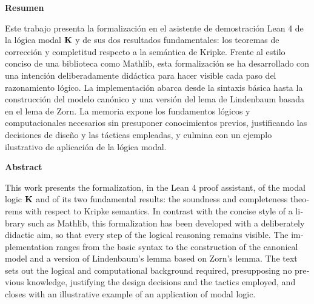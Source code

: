 
\newcommand{\rotuloresumen}[1]{%
  \begin{center}
    {\LARGE\bfseries #1\par}
  \end{center}
  \vspace{0.8\baselineskip}%
}

\thispagestyle{plain}
\markboth{}{}
\vspace*{2\baselineskip}

\rotuloresumen{Resumen}

\noindent Este trabajo presenta la formalización en el asistente de demostración Lean 4 de la lógica modal $\mathbf{K}$ y de sus dos resultados fundamentales: los teoremas de corrección y completitud respecto a la semántica de Kripke. Frente al estilo conciso de una biblioteca como Mathlib, esta formalización se ha desarrollado con una intención deliberadamente didáctica para hacer visible cada paso del razonamiento lógico. La implementación abarca desde la sintaxis básica hasta la construcción del modelo canónico y una versión del lema de Lindenbaum basada en el lema de Zorn. La memoria expone los fundamentos lógicos y computacionales necesarios sin presuponer conocimientos previos, justificando las decisiones de diseño y las tácticas empleadas, y culmina con un ejemplo ilustrativo de aplicación de la lógica modal.

\vspace{3\baselineskip}

\rotuloresumen{Abstract}

\begin{otherlanguage}{english}
\noindent This work presents the formalization, in the Lean 4 proof assistant, of the modal logic $\mathbf{K}$ and of its two fundamental results: the soundness and completeness theorems with respect to Kripke semantics. In contrast with the concise style of a library such as Mathlib, this formalization has been developed with a deliberately didactic aim, so that every step of the logical reasoning remains visible. The implementation ranges from the basic syntax to the construction of the canonical model and a version of Lindenbaum's lemma based on Zorn's lemma. The text sets out the logical and computational background required, presupposing no previous knowledge, justifying the design decisions and the tactics employed, and closes with an illustrative example of an application of modal logic.
\end{otherlanguage}